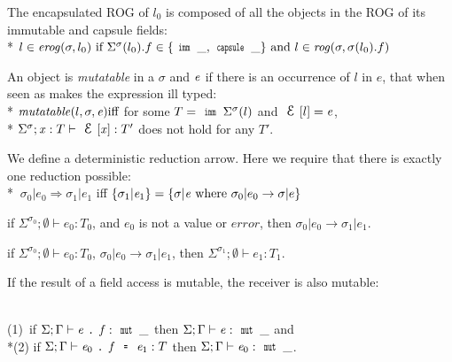 The encapsulated ROG of $l_0$ is composed of all the objects
in the ROG of its immutable and capsule fields:\\*
\indent $l \in \mathit{erog}(\sigma,l_0)
\text{ if } \Sigma^\sigma(l_0).f \in \{\Kw{imm}\,\_,\Kw{capsule}\,\_\}
\text{ and } l \in \mathit{rog}(\sigma,\sigma(l_0).f)
$\loseSpace

\noindent An object is \emph{mutatable} in a $\sigma$ and  ${\mathit{e}}$ if there is an occurrence of 
$l$ in $e$, that when seen as \Q@imm@ makes the expression ill typed:\\*
$\mathit{mutatable}(l,\sigma,{\mathit{e}}) \text{iff}$ for some $T=\Kw{imm}\,\Sigma^\sigma(l)$ and $\ctx[l]=\e$,\\*
\indent $\Sigma^\sigma;\x:T\vdash\ctx[\x]:T'$ does not hold for any $T'$.\loseSpace

\noindent We define
a deterministic reduction arrow.
Here we require that there is exactly one reduction possible:\\*
\indent$\ \sigma_0|e_0\Rightarrow \sigma_1|e_1$ iff $\{\sigma_1|{\mathit{e}}_1\}=\{\sigma|{\mathit{e}} \text{ where } \sigma_0|e_0\rightarrow \sigma|e\}$



\begin{Assumption}[Progress]
if $\Sigma^{\sigma_0};\emptyset\vdash e_0: T_0$,
and $e_0$ is not a value or $\mathit{error}$, then
$\sigma_0|e_0\rightarrow \sigma_1|e_1$.
\end{Assumption}


\begin{Assumption}
if $\Sigma^{\sigma_0};\emptyset\vdash e_0: T_0$,
$\sigma_0|e_0\rightarrow \sigma_1|e_1$,
then
$\Sigma^{\sigma_1};\emptyset\vdash e_1: T_1$.
\end{Assumption}


\noindent If the result of a field access is mutable,
the receiver is also mutable:\saveSpace\saveSpace
\begin{Assumption}
\ \\
\indent(1)\ if $\Sigma;\Gamma\vdash\e\singleDot\f:\Kw{mut}\,\_$
then $\Sigma;\Gamma\vdash\e:\Kw{mut}\,\_$
 and 
\\*\indent(2)
if $\Sigma;\Gamma\vdash\e_0\singleDot\f\equals\e_1:T$
then $\Sigma;\Gamma\vdash\e_0:\Kw{mut}\,\_$.
\end{Assumption}

